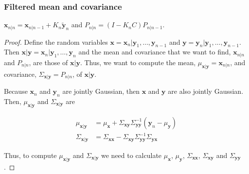 \begin{frame}
    \frametitle{Filtered mean and covariance}

    \scriptsize
    \begin{claim}
        $\mathbf{x}_{n|n}=\mathbf{x}_{n|n-1}+K_n\tilde{\mathbf{y}}_n$ and
        $P_{n|n}=(I-K_nC)P_{n|n-1}$.
        \label{claim:filteringMeanAndCov}
    \end{claim}

    \begin{proof}\renewcommand{\qedsymbol}{}

    Define the random variables
    $\mathbf{x}=\mathbf{x}_n|\mathbf{y}_1,\ldots,\mathbf{y}_{n-1}$ and
    $\mathbf{y}=\mathbf{y}_n|\mathbf{y}_1,\ldots,\mathbf{y}_{n-1}$. Then
    $\mathbf{x}|\mathbf{y}=\mathbf{x}_n|\mathbf{y}_1,\ldots,\mathbf{y}_n$ and
    the mean and covariance that we want to find, $\mathbf{x}_{n|n}$ and
    $P_{n|n}$, are those of $\mathbf{x}|\mathbf{y}$.  Thus, we want to compute
    the mean, $\mu_{\mathbf{x}|\mathbf{y}}=\mathbf{x}_{n|n}$, and covariance,
    $\Sigma_{\mathbf{x}|\mathbf{y}}=P_{n|n}$, of $\mathbf{x}|\mathbf{y}$.

    Because $\mathbf{x}_n$ and $\mathbf{y}_n$ are jointly Gaussian, then
    $\mathbf{x}$ and $\mathbf{y}$ are also jointly Gaussian. Then, $\mu_{\mathbf{x}|\mathbf{y}}$
    and $\Sigma_{\mathbf{x}|\mathbf{y}}$ are \citep[][Chapter 2]{bishop06}

    \begin{align}
        \mu_{\mathbf{x}|\mathbf{y}}&=\mu_{\mathbf{x}} +
        \Sigma_{\mathbf{x}\mathbf{y}}\Sigma_{\mathbf{y}\mathbf{y}}^{-1}(\mathbf{y}_n-\mu_{\mathbf{y}})\label{eq:muxgy}\\
        \Sigma_{\mathbf{x}|\mathbf{y}}&=\Sigma_{\mathbf{x}\mathbf{x}}-\Sigma_{\mathbf{x}\mathbf{y}}\Sigma_{\mathbf{y}\mathbf{y}}^{-1}\Sigma_{\mathbf{y}\mathbf{x}}\label{eq:sigmaxgy}
    \end{align}

    Thus, to compute $\mu_{\mathbf{x}|\mathbf{y}}$ and $\Sigma_{\mathbf{x}|\mathbf{y}}$ we need to calculate
    $\mu_{\mathbf{x}}$, $\mu_{\mathbf{y}}$, $\Sigma_{\mathbf{x}\mathbf{x}}$, $\Sigma_{\mathbf{x}\mathbf{y}}$ and $\Sigma_{\mathbf{y}\mathbf{y}}$.


    \end{proof}

    \normalsize
\end{frame}

